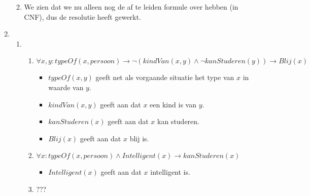 \documentclass[]{article}
\begin{document}
\begin{enumerate}[a]
\begin{enumerate}[i]
\begin{enumerate}[1]
      \end{enumerate}
      \item We zien dat we nu alleen nog de af te leiden formule over hebben (in CNF), dus de resolutie heeft gewerkt.
    \end{enumerate}
    \item %
      \begin{enumerate}[i]
        \item
        \begin{enumerate}[1]
          \item $\forall x, y: typeOf(x, persoon) \longrightarrow \lnot(kindVan(x, y) \land \lnot kanStuderen(y)) \longrightarrow Blij(x)$
          \begin{itemize}
            \item $typeOf(x, y)$ geeft net als vorgaande situatie het type van $x$ in waarde van $y$.
            \item $kindVan(x, y)$ geeft aan dat $x$ een kind is van $y$.
            \item $kanStuderen(x)$ geeft aan dat $x$ kan studeren.
            \item $Blij(x)$ geeft aan dat $x$ blij is.
          \end{itemize}
          \item $\forall x: typeOf(x, persoon) \land Intelligent(x) \longrightarrow kanStuderen(x)$
          \begin{itemize}
            \item $Intelligent(x)$ geeft aan dat $x$ intelligent is.
          \end{itemize}
          \item $???$
        \end{enumerate}

  \end{enumerate}


\end{enumerate}
\end{document}
